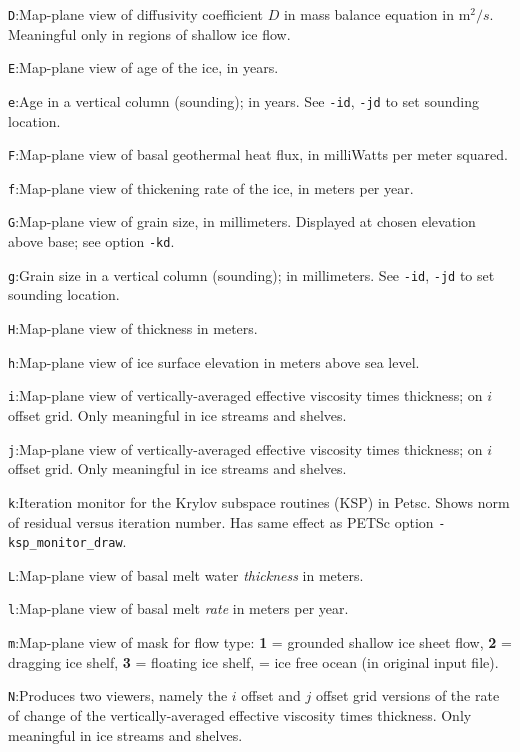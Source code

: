 \documentclass[11pt,final]{amsart}
\begin{document}
\verb|D|:\quad Map-plane view of diffusivity coefficient $D$ in mass balance equation in $\text{m}^2/s$.  Meaningful only in regions of shallow ice flow.

\verb|E|:\quad Map-plane view of age of the ice, in years.

\verb|e|:\quad Age in a vertical column (sounding); in years.  See \verb|-id|, \verb|-jd| to set sounding location.

\verb|F|:\quad Map-plane view of basal geothermal heat flux, in milliWatts per meter squared.

\verb|f|:\quad Map-plane view of thickening rate of the ice, in meters per year.

\verb|G|:\quad Map-plane view of grain size, in millimeters.  Displayed at chosen elevation above base; see option \verb|-kd|.

\verb|g|:\quad Grain size in a vertical column (sounding); in millimeters.  See \verb|-id|, \verb|-jd| to set sounding location.

\verb|H|:\quad Map-plane view of thickness in meters.

\verb|h|:\quad Map-plane view of ice surface elevation in meters above sea level.

\verb|i|:\quad Map-plane view of vertically-averaged effective viscosity times thickness; on $i$ offset grid.  Only meaningful in ice streams and shelves.

\verb|j|:\quad Map-plane view of vertically-averaged effective viscosity times thickness; on $i$ offset grid.  Only meaningful in ice streams and shelves.

\verb|k|:\quad Iteration monitor for the Krylov subspace routines (KSP) in Petsc.  Shows norm of residual versus iteration number.  Has same effect as PETSc option \verb|-ksp_monitor_draw|.

\verb|L|:\quad Map-plane view of basal melt water \emph{thickness} in meters.

\verb|l|:\quad Map-plane view of basal melt \emph{rate} in meters per year.

\verb|m|:\quad Map-plane view of mask for flow type:  \textbf{1} = grounded shallow ice sheet flow,  \textbf{2} = dragging ice shelf, \textbf{3} = floating ice shelf,  = ice free ocean (in original input file).

\verb|N|:\quad Produces two viewers, namely the $i$ offset and $j$ offset grid versions of the rate of change of the vertically-averaged effective viscosity times thickness.  Only meaningful in ice streams and shelves.
\end{document}
